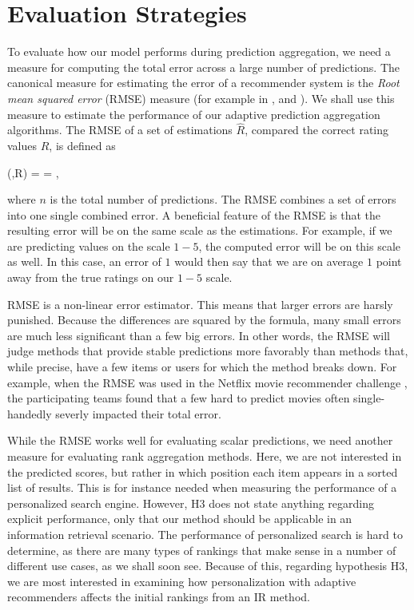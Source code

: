 \section{Evaluation Strategies}

To evaluate how our model performs during prediction aggregation, 
we need a measure for computing the total error across a large number of predictions.
The canonical measure for estimating the error of a recommender system
is the \emph{Root mean squared error} (RMSE) measure
(for example in \citet[p17]{Herlocker2004}, \citet[p13]{Adomavicius2005} and \citet[p6]{Bell2007}).
We shall use this measure to estimate the performance
of our adaptive prediction aggregation algorithms.
The RMSE of a set of estimations $\hat{R}$, 
compared the correct rating values $R$, is defined as

\begin{eqsp}
  (,R) = 
  = ,
\end{eqsp}
%
where $n$ is the total number of predictions.
The RMSE combines a set of errors into one single combined error.
A beneficial feature of the RMSE is that the resulting error 
will be on the same scale as the estimations. For example,
if we are predicting values on the scale $1-5$, the computed error
will be on this scale as well. In this case, an error of $1$
would then say that we are on average $1$ point away from the true 
ratings on our $1-5$ scale.

RMSE is a non-linear error estimator.
This means that larger errors are harsly punished.
Because the differences are squared by the formula,
many small errors are much less significant than a few big errors.
In other words, the RMSE will judge methods that provide
stable predictions more favorably
than methods that, while precise, have a few items
or users for which the method breaks down.
For example, when the RMSE was used in the Netflix movie recommender challenge
\citep{Linden2009}, the participating teams
found that a few hard to predict movies often 
single-handedly severly impacted their total error.

While the RMSE works well for evaluating scalar predictions,
we need another measure for evaluating rank aggregation methods.
Here, we are not interested in the predicted scores,
but rather in which position each item appears in a sorted list of results.
This is for instance needed when measuring the performance of a
personalized search engine.
However, H3 does not state anything regarding explicit performance,
only that our method should be applicable in an information retrieval scenario.
The performance of personalized search is hard to determine,
as there are many types of rankings that make sense in a number of different use cases,
as we shall soon see.
Because of this, regarding hypothesis H3, 
we are most interested in examining how  personalization with adaptive recommenders 
affects the initial rankings from an IR method.



